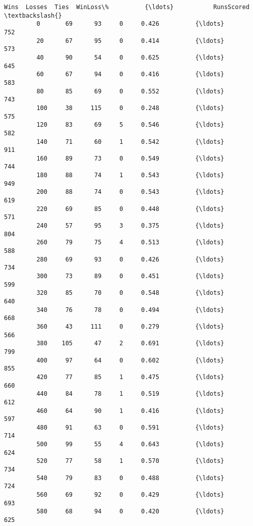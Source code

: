 \documentclass[11pt]{article}
\begin{document}
\begin{Verbatim}[commandchars=\\\{\}]
               Wins  Losses  Ties  WinLoss\%          {\ldots}           RunsScored  \textbackslash{}
         0       69      93     0     0.426          {\ldots}                  752   
         20      67      95     0     0.414          {\ldots}                  573   
         40      90      54     0     0.625          {\ldots}                  645   
         60      67      94     0     0.416          {\ldots}                  583   
         80      85      69     0     0.552          {\ldots}                  743   
         100     38     115     0     0.248          {\ldots}                  575   
         120     83      69     5     0.546          {\ldots}                  582   
         140     71      60     1     0.542          {\ldots}                  911   
         160     89      73     0     0.549          {\ldots}                  744   
         180     88      74     1     0.543          {\ldots}                  949   
         200     88      74     0     0.543          {\ldots}                  619   
         220     69      85     0     0.448          {\ldots}                  571   
         240     57      95     3     0.375          {\ldots}                  804   
         260     79      75     4     0.513          {\ldots}                  588   
         280     69      93     0     0.426          {\ldots}                  734   
         300     73      89     0     0.451          {\ldots}                  599   
         320     85      70     0     0.548          {\ldots}                  640   
         340     76      78     0     0.494          {\ldots}                  668   
         360     43     111     0     0.279          {\ldots}                  566   
         380    105      47     2     0.691          {\ldots}                  799   
         400     97      64     0     0.602          {\ldots}                  855   
         420     77      85     1     0.475          {\ldots}                  660   
         440     84      78     1     0.519          {\ldots}                  612   
         460     64      90     1     0.416          {\ldots}                  597   
         480     91      63     0     0.591          {\ldots}                  714   
         500     99      55     4     0.643          {\ldots}                  624   
         520     77      58     1     0.570          {\ldots}                  734   
         540     79      83     0     0.488          {\ldots}                  724   
         560     69      92     0     0.429          {\ldots}                  693   
         580     68      94     0     0.420          {\ldots}                  625   

\end{Verbatim}
\end{document}
